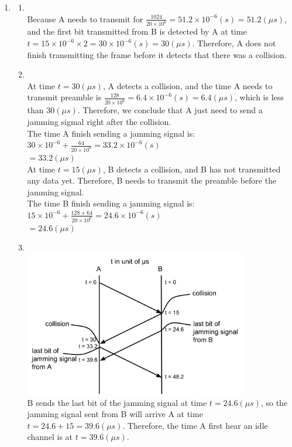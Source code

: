 \documentclass[10pt, a4paper]{article}
\begin{document}
\begin{enumerate}
\item\mbox{}
    \begin{enumerate}
    \item\mbox{}\\
        Because A needs to transmit for $\frac{1024}{20 \times 10^6} = 51.2 \times 10^{-6} (s) = 51.2 (\mu s)$, and the first bit transmitted from B is detected by A at time $t = 15 \times 10^{-6} \times 2 = 30 \times 10^{-6} (s) = 30 (\mu s)$. Therefore, A does not finish transmitting the frame before it detects that there was a collision.
    \item\mbox{}\\
        At time $t = 30 (\mu s)$, A detects a collision, and the time A needs to transmit preamble is $\frac{128}{20 \times 10^6} = 6.4 \times 10^{-6} (s) = 6.4 (\mu s)$, which is less than $30 (\mu s)$. Therefore, we conclude that A just need to send a jamming sigmal right after the collision.\\
        The time A finish sending a jamming signal is:\\
        $30 \times 10^{-6} + \frac{64}{20 \times 10^6} = 33.2 \times 10^{-6} (s)$\\
        $= 33.2 (\mu s)$\\
        At time $t = 15 (\mu s)$, B detects a collision, and B has not transmitted any data yet. Therefore, B needs to transmit the preamble before the jamming signal.\\
        The time B finish sending a jamming signal is:\\
        $15 \times 10^{-6} + \frac{128 + 64}{20 \times 10^6} = 24.6 \times 10^{-6} (s)$\\
        $= 24.6 (\mu s)$
    \item\mbox{}\\
        \includegraphics[height=2.5in]{images/problem_5c}\\
        B sends the last bit of the jamming signal at time $t = 24.6 (\mu s)$, so the jamming signal sent from B will arrive A at time $t = 24.6 + 15 = 39.6 (\mu s)$. Therefore, the time A first hear an idle channel is at $t = 39.6 (\mu s)$.\\

\end{enumerate}
\end{enumerate}
\end{document}
